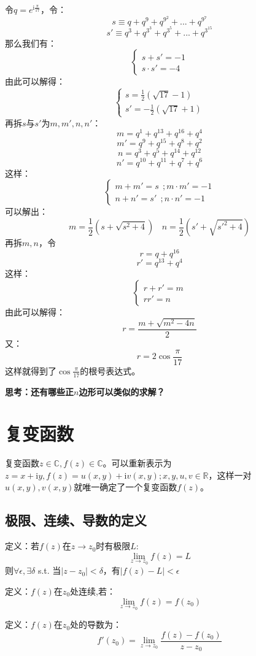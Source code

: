 令$q=e^{\mathrm{i}\frac{\pi}{17}}$，令：
\[s \equiv q+q^9+q^{9^2}+...+q^{9^7}\]
\[s'\equiv q^3+q^{3^3}+q^{3^5}+...+q^{3^{15}}\]
那么我们有：
\[
\left\{
\begin{array}{c}
s+s'=-1\\
s\cdot s'=-4
\end{array}
\right.
\]
由此可以解得：
\[
\left\{
\begin{array}{c}
s = \frac{1}{2}(\sqrt{17}-1)\\
s'= -\frac{1}{2}(\sqrt{17}+1)
\end{array}
\right.
\]
再拆$s$与$s'$为$m,m',n,n'$：
\[m = q^1+q^{13}+q^{16}+q^4\]
\[m' = q^9+q^{15}+q^8+q^2\]
\[n = q^3+q^5+q^{14}+q^{12}\]
\[n' = q^{10}+q^{11}+q^7+q^6\]
这样：
\[
\left\{
\begin{array}{l}
m+m' = s \ \ ;m\cdot m'=-1\\
n+n' = s' \ \ ;n\cdot n'=-1
\end{array}
\right.
\]
可以解出：
\[m = \frac{1}{2}(s+\sqrt{s^2+4})\ \ \ \ n = \frac{1}{2}(s'+\sqrt{s'^2+4})\]
再拆$m,n$，令
\[r = q+q^{16}\]
\[r' = q^{13}+q^4\]
这样：
\[
\left\{
\begin{array}{l}
r+r'=m\\
rr'=n
\end{array}
\right.
\]
由此可以解得：
\[r = \frac{m+\sqrt{m^2-4n}}{2}\]
又：
\[r=2 \cos \frac{\pi}{17}\]
这样就得到了$\cos \frac{\pi}{17}$的根号表达式。

\textbf{思考：还有哪些正$n$边形可以类似的求解？}

\section{复变函数}
复变函数$z\in\mathbb{C},f(z)\in\mathbb{C}$。可以重新表示为$z=x+\mathrm{i}y,f(z)=u(x,y)+\mathrm{i}v(x,y);x,y,u,v\in\mathbb{R}$，这样一对$u(x,y),v(x,y)$就唯一确定了一个复变函数$f(z)$。
\subsection{极限、连续、导数的定义}
定义：若$f(z)$在$z\rightarrow z_0$时有极限$L$:
\[\lim\limits_{z\rightarrow z_0}f(z) = L\]
则$\forall\epsilon,\exists\delta$ s.t. 当$\left|z-z_0\right|<\delta$，有$\left|f(z)-L\right|<\epsilon$

定义：$f(z)$在$z_0$处连续,若：
\begin{equation}
\lim\limits_{z\rightarrow z_0}f(z) = f(z_0)
\end{equation}

定义：$f(z)$在$z_0$处的导数为：
\begin{equation}
f'(z_0) = \lim\limits_{z\rightarrow z_0}\frac{f(z)-f(z_0)}{z-z_0}
\end{equation}

